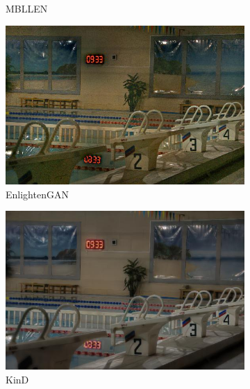 \documentclass[a4paper, 10pt]{article}
\begin{document}
\begin{figure}[htb]
\begin{subfigure}{0.19\textwidth}
				\captionsetup{font=scriptsize}
				\caption{MBLLEN}
				\label{fig: MBLLEN}
			\end{subfigure}
			\begin{subfigure}{0.19\textwidth}
				\includegraphics[width=\linewidth]{picture/LLIE/Experiment/EnlightenGAN}
				\captionsetup{font=scriptsize}
				\caption{EnlightenGAN}
				\label{fig: EnlightenGAN}
			\end{subfigure}
			\begin{subfigure}{0.19\textwidth}
				\includegraphics[width=\linewidth]{picture/LLIE/Experiment/KinD}
				\captionsetup{font=scriptsize}
				\caption{KinD}
				\label{fig: KinD}
			\end{subfigure}\\
			\begin{subfigure}{0.19\textwidth}

\end{subfigure}
\end{figure}
\end{document}
